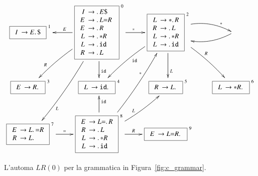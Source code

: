 \begin{figure}[t]
\[
\xymatrix{
  \fbox{$\begin{array}{rl}
    I \!\!\!& \to E\idot\mathtt{\$}
  \end{array}$}^{\ 1}
  &
  \fbox{$
  \begin{array}{rl}
     I \!\!\!& \to \idot E\mathtt{\$}\\
     E \!\!\!& \to \idot L\mathtt{=}R\\
     E \!\!\!& \to \idot R\\
     L \!\!\!& \to \idot \mathtt{*}R\\
     L \!\!\!& \to \idot \mathtt{id}\\
     R \!\!\!& \to \idot L
  \end{array}$
  }^{\ 0}\ar[l]_E\ar[r]^{\mathtt{*}}\ar[d]^(.7){\mathtt{id}}\ar@/^/[ddl]^(.7)L
    \ar@/_/[ld]_(.7)R
  &
  \fbox{$\begin{array}{rl}
    L \!\!\!& \to \mathtt{*}\idot R \\
    R \!\!\!& \to \idot L\\
    L \!\!\!& \to \idot \mathtt{*}R\\
    L \!\!\!& \to \idot \mathtt{id}
  \end{array}$}^{\ 2}\ar@/^/[rd]^{R}\ar[d]^(.7)L\ar@/_/[ld]^{\mathtt{id}}
      \ar@/^3ex/[r]^(.8){\mathtt{*}}
  &
  {}\ar@/^3ex/[l]
  \\
  \fbox{$\begin{array}{rl}
    E \!\!\!& \to R\idot
  \end{array}$}^{\ 3}
  &
  \fbox{$\begin{array}{rl}
    L \!\!\!& \to \mathtt{id}\idot
  \end{array}$}^{\ 4}
  &
  \fbox{$\begin{array}{rl}
    R \!\!\!& \to L\idot
  \end{array}$}^{\ 5}
  &
  \fbox{$\begin{array}{rl}
    L \!\!\!& \to \mathtt{*}R\idot
  \end{array}$}^{\ 6}
  \\
  \fbox{$\begin{array}{rl}
    E \!\!\!& \to L\idot\mathtt{=}R\\
    R \!\!\!& \to L\idot
  \end{array}$}^{\ 7}\ar[r]^{\mathtt{=}}
  &
  \fbox{$\begin{array}{rl}
    E \!\!\!& \to L\mathtt{=}\idot R\\
    R \!\!\!& \to \idot L\\
    L \!\!\!& \to \idot \mathtt{*}R\\
    L \!\!\!& \to \idot\mathtt{id}
  \end{array}$}^{\ 8}
    \ar[r]^R\ar[u]_(.7){\mathtt{id}}\ar@/_/[uur]^(.6){\mathtt{*}}
    \ar@/_/[ru]^L
  &
  \fbox{$\begin{array}{rl}
    E \!\!\!& \to L\mathtt{=}R\idot
  \end{array}$}^{\ 9}
}
\]
\caption{L'automa $\mathit{LR}(0)$
         per la grammatica in Figura~\ref{fig:c_grammar}.}
  \label{fig:c_grammar_lr0_automaton}
\end{figure}
